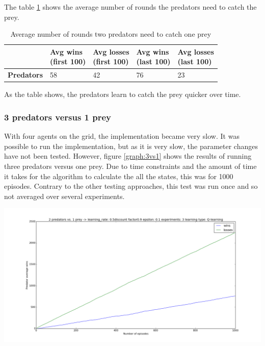 The table \ref{table:2vs1} shows the average number of rounds the predators need to catch the prey.

\begin{table}[H]
\begin{center}
\begin{tabular}{| l | l | l | l | l |}
\hline
 & \parbox{2cm}{\textbf{Avg wins \\ (first 100)}} & \parbox{2cm}{\textbf{Avg losses \\ (first 100)}} & \parbox{2cm}{\textbf{Avg wins \\ (last 100)}} & \parbox{2cm}{\textbf{Avg losses \\ (last 100)}} \\
\hline
\textbf{Predators} & 58 & 42 & 76 & 23 \\
\hline
\end{tabular}
\caption{Average number of rounds two predators need to catch one prey}
\label{table:2vs1}
\end{center}
\end{table}

As the table shows, the predators learn to catch the prey quicker over time.

\subsubsection{3 predators versus 1 prey}
With four agents on the grid, the implementation became very slow. It was possible to run the implementation, but as it is very slow, the parameter changes have not been tested. However, figure \ref{graph:3vs1} shows the results of running three predators versus one prey. Due to time constraints and the amount of time it takes for the algorithm to calculate the all the states, this was for 1000 episodes. Contrary to the other testing approaches, this test was run once and so not averaged over several experiments.

\begin{center}
	\includegraphics[scale=0.3]{3_predators_3_ex_1000_runs_q-learning}
	\label{graph:3vs1}
\end{center}


